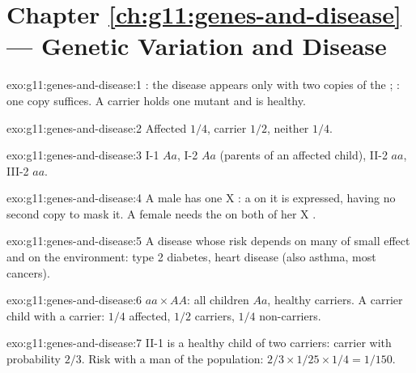 \section*{Chapter \ref{ch:g11:genes-and-disease} --- Genetic Variation and Disease}

\begin{solution}{exo:g11:genes-and-disease:1}
: the disease appears only with two copies of the ;
: one copy suffices. A carrier holds one  mutant
 and is healthy.
\end{solution}

\begin{solution}{exo:g11:genes-and-disease:2}
Affected $1/4$, carrier $1/2$, neither $1/4$.
\end{solution}

\begin{solution}{exo:g11:genes-and-disease:3}
I-1 $Aa$, I-2 $Aa$ (parents of an affected child), II-2 $aa$, III-2
$aa$.
\end{solution}

\begin{solution}{exo:g11:genes-and-disease:4}
A male has one X : a   on it is expressed,
having no second copy to mask it. A female needs the  on both
of her X .
\end{solution}

\begin{solution}{exo:g11:genes-and-disease:5}
A disease whose risk depends on many  of small effect and on
the environment: type 2 diabetes, heart disease (also asthma, most
cancers).
\end{solution}

\begin{solution}{exo:g11:genes-and-disease:6}
$aa \times AA$: all children $Aa$, healthy carriers. A carrier child
with a carrier: $1/4$ affected, $1/2$ carriers, $1/4$ non-carriers.
\end{solution}

\begin{solution}{exo:g11:genes-and-disease:7}
II-1 is a healthy child of two carriers: carrier with probability
$2/3$. Risk with a man of the population: $2/3 \times 1/25 \times 1/4
= 1/150$.
\end{solution}

